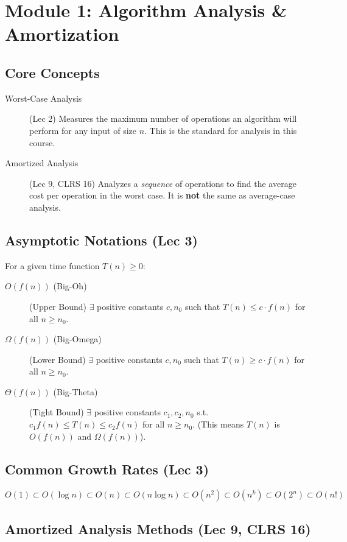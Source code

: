 
\section{Module 1: Algorithm Analysis \& Amortization}

\subsection{Core Concepts}
\begin{description}
    \item[Worst-Case Analysis] (Lec 2) Measures the maximum number of operations an algorithm will perform for any input of size $n$. This is the standard for analysis in this course.
    \item[Amortized Analysis] (Lec 9, CLRS 16) Analyzes a \textit{sequence} of operations to find the average cost per operation in the worst case. It is \textbf{not} the same as average-case analysis.
\end{description}

\subsection{Asymptotic Notations (Lec 3)}
\noindent For a given time function $T(n) \ge 0$:
\begin{description}
    \item[$O(f(n))$ (Big-Oh)] (Upper Bound) $\exists$ positive constants $c, n_0$ such that $T(n) \le c \cdot f(n)$ for all $n \ge n_0$.
    \item[$\Omega(f(n))$ (Big-Omega)] (Lower Bound) $\exists$ positive constants $c, n_0$ such that $T(n) \ge c \cdot f(n)$ for all $n \ge n_0$.
    \item[$\Theta(f(n))$ (Big-Theta)] (Tight Bound) $\exists$ positive constants $c_1, c_2, n_0$ s.t. $c_1 f(n) \le T(n) \le c_2 f(n)$ for all $n \ge n_0$. (This means $T(n)$ is $O(f(n))$ and $\Omega(f(n))$).
\end{description}

\subsection{Common Growth Rates (Lec 3)}
$O(1) \subset O(\log n) \subset O(n) \subset O(n \log n) \subset O(n^2) \subset O(n^k) \subset O(2^n) \subset O(n!)$

\subsection{Amortized Analysis Methods (Lec 9, CLRS 16)}
